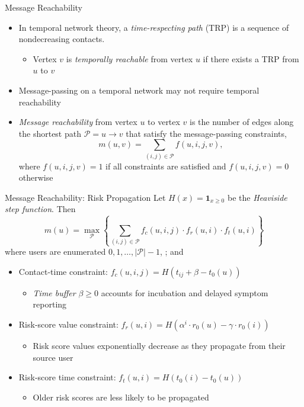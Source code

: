 \documentclass[13pt,aspectratio=169]{beamer}
\newcommand{\tbuf}{\beta}
\newcommand{\trate}{\alpha}
\newcommand{\scoeff}{\gamma}
\newcommand{\vsym}{r}
\newcommand{\tsym}{t}
\newcommand{\msym}{m}
\newcommand{\ival}{\vsym_0}
\newcommand{\itime}{\tsym_0}
\newcommand{\reach}{\msym}
\newcommand{\card}[1]{\left\vert #1 \right\vert}
\newcommand{\vpath}[2]{#1 \rightarrow #2}
\newcommand{\pathsym}{\mathcal{P}}
\begin{document}
\begin{frame}{Message Reachability}
\begin{itemize}
\item In temporal network theory, a \emph{time-respecting path} (TRP) is a sequence of nondecreasing contacts.
	\begin{itemize}
	\item Vertex $v$ is \emph{temporally reachable} from vertex $u$ if there exists a TRP from $u$ to $v$
	\end{itemize}
\item Message-passing on a temporal network may not require temporal reachability
\item \emph{Message reachability} from vertex $u$ to vertex $v$ is the number of edges along the shortest path $\pathsym = \vpath{u}{v}$ that satisfy the message-passing constraints,
	\begin{equation*}
		\reach(u, v) = \sum_{(i, j) \in \pathsym} f(u, i, j, v),
	\end{equation*}
where $f(u, i, j, v) = 1$ if all constraints are satisfied and $f(u, i, j, v) = 0$ otherwise
\end{itemize}
\end{frame}

\begin{frame}{Message Reachability: Risk Propagation}
Let $H(x) = \mathbf{1}_{x \geq 0}$ be the \emph{Heaviside step function}. Then
\begin{equation*}
    \reach(u) = \underset{\pathsym}{\max} \left\{\sum_{(i, j) \in \pathsym} f_c(u, i, j) \cdot f_{\vsym}(u, i) \cdot f_{\tsym}(u, i) \right\}
\end{equation*}
where users are enumerated $0, 1, \ldots, \card{\pathsym} - 1$, ; and
	\begin{itemize}
	\item Contact-time constraint: $f_c(u, i, j) = H(\tsym_{ij} + \tbuf - \itime(u))$
		\begin{itemize}
		\item \emph{Time buffer} $\tbuf \geq 0$ accounts for incubation and delayed symptom reporting
		\end{itemize}
	\item Risk-score value constraint: $f_r(u, i) = H(\trate^i \cdot \ival(u) - \scoeff \cdot \ival(i))$
		\begin{itemize}
		\item Risk score values exponentially decrease as they propagate from their source user
		\end{itemize}
	\item Risk-score time constraint: $f_t(u, i) = H(\itime(i) - \itime(u))$
		\begin{itemize}
		\item Older risk scores are less likely to be propagated
		\end{itemize}
	\end{itemize}
\end{frame}
\end{document}
